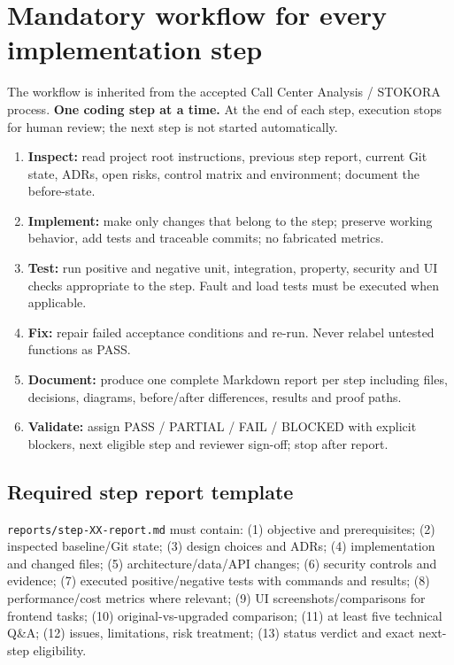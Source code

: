 \documentclass[10.5pt,a4paper,oneside]{article}
\begin{document}
\section{Mandatory workflow for every implementation step}
The workflow is inherited from the accepted Call Center Analysis / STOKORA process. \textbf{One coding step at a time.} At the end of each step, execution stops for human review; the next step is not started automatically.
\begin{enumerate}[label=\textbf{\arabic*.}]
\item \textbf{Inspect:} read project root instructions, previous step report, current Git state, ADRs, open risks, control matrix and environment; document the before-state.
\item \textbf{Implement:} make only changes that belong to the step; preserve working behavior, add tests and traceable commits; no fabricated metrics.
\item \textbf{Test:} run positive and negative unit, integration, property, security and UI checks appropriate to the step. Fault and load tests must be executed when applicable.
\item \textbf{Fix:} repair failed acceptance conditions and re-run. Never relabel untested functions as PASS.
\item \textbf{Document:} produce one complete Markdown report per step including files, decisions, diagrams, before/after differences, results and proof paths.
\item \textbf{Validate:} assign PASS / PARTIAL / FAIL / BLOCKED with explicit blockers, next eligible step and reviewer sign-off; stop after report.
\end{enumerate}
\subsection{Required step report template}
\begin{keybox}
\texttt{reports/step-XX-report.md} must contain: (1) objective and prerequisites; (2) inspected baseline/Git state; (3) design choices and ADRs; (4) implementation and changed files; (5) architecture/data/API changes; (6) security controls and evidence; (7) executed positive/negative tests with commands and results; (8) performance/cost metrics where relevant; (9) UI screenshots/comparisons for frontend tasks; (10) original-vs-upgraded comparison; (11) at least five technical Q\&A; (12) issues, limitations, risk treatment; (13) status verdict and exact next-step eligibility.
\end{keybox}
\end{document}
